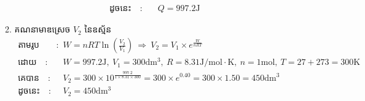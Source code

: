 \documentclass{classes/exam}
\begin{document}
\begin{enumerate}[I]
\begin{enumerate}[k]
\begin{align*}
				\text{ដូចនេះ}\quad :&\quad Q=997.2\si{\joule}
			\end{align*}
		\item គណនាមាឌស្រេច $V_{2}$ នៃឧស្ម័ន
			\begin{align*}
				\text{តាមរូបមន្ត}\quad:&\quad W=nRT\ln\left(\frac{V_{2}}{V_{1}}\right)~\Rightarrow~V_{2}=V_{1}\times e^{\frac{W}{nRT}}\\
				\text{ដោយ}\quad :&\quad W=997.2\si{\joule},~V_{1}=300\si{\deci\metre^{3}},~R=8.31\si{\joule/\mole\cdot\kelvin},~n=1\si{\mole},~T=27+273=300\si{\kelvin}\\
				\text{គេបាន}\quad :&\quad V_{2}=300\times 10^{\frac{997.2}{1\times 8.31\times 300}}=300\times e^{0.40}=300\times 1.50=450\si{\deci \metre ^{3}}\\
				\text{ដូចនេះ}\quad :&\quad V_{2}=450\si{\deci \metre ^{3}}
			\end{align*}
	\end{enumerate}
\end{enumerate}
\end{document}
